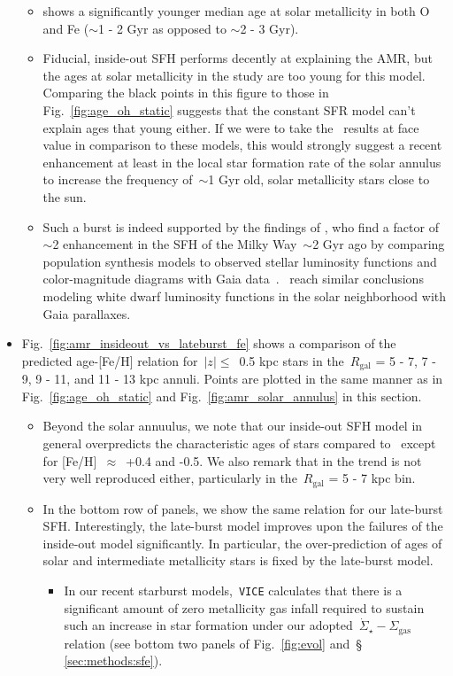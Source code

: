 \documentclass[fleqn, usenatbib]{mnras}
\begin{document}
\begin{itemize}
\begin{itemize}
		\item \citet{Feuillet2018} shows a significantly younger median age at 
		solar metallicity in both O and Fe ($\sim$1 - 2 Gyr as opposed to 
		$\sim$2 - 3 Gyr). 

		\item Fiducial, inside-out SFH performs decently at explaining the 
		\citet{Feuillet2019} AMR, but the ages at solar metallicity in the 
		\citet{Feuillet2018} study are too young for this model. Comparing the 
		black points in this figure to those in Fig.~\ref{fig:age_oh_static} 
		suggests that the constant SFR model can't explain ages that young 
		either. If we were to take the~\citet{Feuillet2018} results at face 
		value in comparison to these models, this would strongly suggest a 
		recent enhancement at least in the local star formation rate of the 
		solar annulus to increase the frequency of~$\sim$1 Gyr old, solar 
		metallicity stars close to the sun. 

		\item Such a burst is indeed supported by the findings of 
		\citet{Mor2019}, who find a factor of~$\sim$2 enhancement in the SFH 
		of the Milky Way~$\sim$2 Gyr ago by comparing population synthesis 
		models to observed stellar luminosity functions and color-magnitude 
		diagrams with Gaia data~\citep{GaiaDR2}.~\citet{Isern2019} reach 
		similar conclusions modeling white dwarf luminosity functions in the 
		solar neighborhood with Gaia parallaxes. 
	\end{itemize} 

	\item Fig.~\ref{fig:amr_insideout_vs_lateburst_fe} shows a comparison of 
	the predicted age-[Fe/H] relation for~$\left|z\right|\leq$~0.5 kpc stars 
	in the~$R_\text{gal}$ = 5 - 7, 7 - 9, 9 - 11, and 11 - 13 kpc annuli. 
	Points are plotted in the same manner as in Fig.~\ref{fig:age_oh_static} 
	and Fig.~\ref{fig:amr_solar_annulus} in this section. 
	\begin{itemize} 
		\item Beyond the solar annuulus, we note that our inside-out SFH 
		model in general overpredicts the characteristic ages of stars 
		compared to~\citet{Feuillet2019} except for [Fe/H]~$\approx$~+0.4 and 
		-0.5. We also remark that in the trend is not very well reproduced 
		either, particularly in the~$R_\text{gal}$ = 5 - 7 kpc bin. 

		\item In the bottom row of panels, we show the same relation for our 
		late-burst SFH. Interestingly, the late-burst model improves upon the 
		failures of the inside-out model significantly. In particular, the 
		over-prediction of ages of solar and intermediate metallicity stars is 
		fixed by the late-burst model. 
		\begin{itemize} 
			\item In our recent starburst models,~\texttt{VICE} calculates 
			that there is a significant amount of zero metallicity gas infall 
			required to sustain such an increase in star formation under our 
			adopted~$\dot{\Sigma}_\star-\Sigma_\text{gas}$ relation (see 
			bottom two panels of Fig.~\ref{fig:evol} and~\S~
			\ref{sec:methods:sfe}). 


\end{itemize}
\end{itemize}
\end{itemize}
\end{document}
